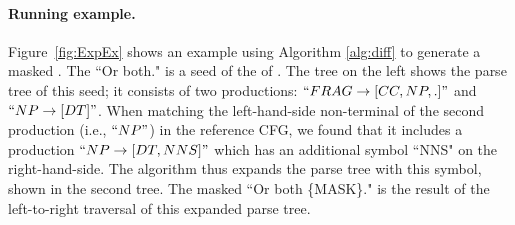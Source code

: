 \paragraph*{Running example.} Figure~\ref{fig:ExpEx} shows an example using Algorithm \ref{alg:diff}
to generate a masked \sent. The \sent ``Or both." is a seed of the \lc of
\SareqExOne.  The tree on the left shows the parse tree of this seed;
it consists of two productions: $``FRAG\rightarrow[CC, NP, .]"$ and $``NP\rightarrow[DT]"$.
When matching the left-hand-side non-terminal of the second production
(i.e., $``NP"$) in the reference CFG, we found that it includes a
production $``NP\rightarrow[DT, NNS]"$ which has an additional symbol ``NNS" on
the right-hand-side.  The algorithm thus expands the parse tree with
this symbol, shown in the second tree.  The masked \sent ``Or both
\{MASK\}." is the result of the left-to-right traversal of this
expanded parse tree.



